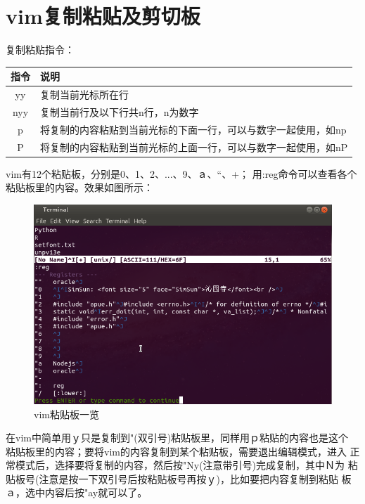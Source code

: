 \section{vim复制粘贴及剪切板}

复制粘贴指令：

\begin{table}[!h]
  \begin{center}
    \begin{tabular}{cl}
      \hline
      指令  & 说明 \\
      \hline
      yy    & 复制当前光标所在行 \\
      \hline
      nyy   & 复制当前行及以下行共n行，n为数字 \\
      \hline
      p     & 将复制的内容粘贴到当前光标的下面一行，可以与数字一起使用，如np \\
      \hline
      P     & 将复制的内容粘贴到当前光标的上面一行，可以与数字一起使用，如nP \\
      \hline
    \end{tabular}
  \end{center}
\end{table}

vim有12个粘贴板，分别是0、1、2、...、9、ａ、“、+；
用:reg命令可以查看各个粘贴板里的内容。效果如图所示：

\begin{figure}[htbp]
  \begin{center}
    \includegraphics[width=.75\textwidth]{graph/vimregister.png}
  \end{center}
  \caption{vim粘贴板一览}
  \label{fig:vimClipBoard}
\end{figure}

在vim中简单用ｙ只是复制到"(双引号)粘贴板里，同样用ｐ粘贴的内容也是这个
粘贴板里的内容；要将vim的内容复制到某个粘贴板，需要退出编辑模式，进入
正常模式后，选择要将复制的内容，然后按"Ny(注意带引号)完成复制，其中Ｎ为
粘贴板号(注意是按一下双引号后按粘贴板号再按ｙ)，比如要把内容复制到粘贴
板ａ，选中内容后按"ay就可以了。

